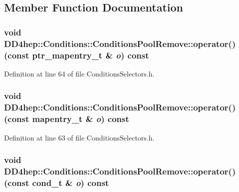 \subsection{Member Function Documentation}
\hypertarget{class_d_d4hep_1_1_conditions_1_1_conditions_pool_remove_a24529ef74e78b830ad29273488ed95d8}{
\subsubsection[{operator()}]{\setlength{\rightskip}{0pt plus 5cm}void DD4hep::Conditions::ConditionsPoolRemove::operator() (const {\bf ptr\_\-mapentry\_\-t} \& {\em o}) const}}
\label{class_d_d4hep_1_1_conditions_1_1_conditions_pool_remove_a24529ef74e78b830ad29273488ed95d8}


Definition at line 64 of file ConditionsSelectors.h.\hypertarget{class_d_d4hep_1_1_conditions_1_1_conditions_pool_remove_a9b69cfdab677208fa5b46a5863999372}{
\subsubsection[{operator()}]{\setlength{\rightskip}{0pt plus 5cm}void DD4hep::Conditions::ConditionsPoolRemove::operator() (const {\bf mapentry\_\-t} \& {\em o}) const}}
\label{class_d_d4hep_1_1_conditions_1_1_conditions_pool_remove_a9b69cfdab677208fa5b46a5863999372}


Definition at line 63 of file ConditionsSelectors.h.\hypertarget{class_d_d4hep_1_1_conditions_1_1_conditions_pool_remove_a85d2a1b3bd59d37678b1ea505bcac116}{
\subsubsection[{operator()}]{\setlength{\rightskip}{0pt plus 5cm}void DD4hep::Conditions::ConditionsPoolRemove::operator() (const {\bf cond\_\-t} \& {\em o}) const}}
\label{class_d_d4hep_1_1_conditions_1_1_conditions_pool_remove_a85d2a1b3bd59d37678b1ea505bcac116}



